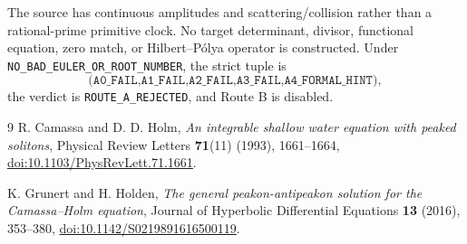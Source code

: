 \documentclass[10pt]{article}
\begin{document}
The source has continuous amplitudes and scattering/collision rather than a
rational-prime primitive clock.  No target determinant, divisor, functional
equation, zero match, or Hilbert--P\'olya operator is constructed.  Under
\texttt{NO\_BAD\_EULER\_OR\_ROOT\_NUMBER}, the strict tuple is
\[
\texttt{(A0\_FAIL,A1\_FAIL,A2\_FAIL,A3\_FAIL,A4\_FORMAL\_HINT)},
\]
the verdict is \texttt{ROUTE\_A\_REJECTED}, and Route B is disabled.
\fi

\begin{thebibliography}{9}
R. Camassa and D. D. Holm,
\emph{An integrable shallow water equation with peaked solitons},
Physical Review Letters \textbf{71}(11) (1993), 1661--1664,
\href{https://doi.org/10.1103/PhysRevLett.71.1661}
{doi:10.1103/PhysRevLett.71.1661}.

K. Grunert and H. Holden,
\emph{The general peakon-antipeakon solution for the Camassa--Holm equation},
Journal of Hyperbolic Differential Equations \textbf{13} (2016), 353--380,
\href{https://doi.org/10.1142/S0219891616500119}
{doi:10.1142/S0219891616500119}.
\end{thebibliography}
\end{document}
